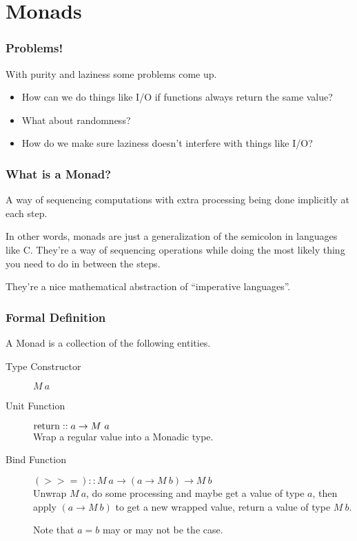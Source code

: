 \documentclass[presentation.tex]{subfiles}
\begin{document}
\section{Monads}
\begin{frame}
  \frametitle{Problems!}

  With purity and laziness some problems come up.

  \begin{itemize}
  \item How can we do things like I/O if functions always return the same value?
  \item What about randomness?
  \item How do we make sure laziness doesn't interfere with things like I/O?
  \end{itemize}
\end{frame}

\begin{frame}
  \frametitle{What is a Monad?}

  A way of sequencing computations with extra processing being done
  implicitly at each step.


\end{frame}

\begin{frame}
  In other words, monads are just a generalization of the semicolon in
  languages like C. They're a way of sequencing operations while doing
  the most likely thing you need to do in between the steps.

  They're a nice mathematical abstraction of ``imperative languages''.
\end{frame}

\begin{frame}
  \frametitle{Formal Definition}

  A Monad is a collection of the following entities.

  \begin{description}
  \item[Type Constructor]
    $M\ a$

  \item[Unit Function]
    $\operatorname{return}::a\rightarrow M\ a$\\
    Wrap a regular value into a Monadic type.

  \item[Bind Function]
    $(>>=)::M\ a\rightarrow(a\rightarrow M\ b)\rightarrow M\ b$\\
    Unwrap $M\ a$, do some processing and maybe get a value of type $a$, then
    apply $(a\rightarrow M\ b)$ to get a new wrapped value, return a value of
    type $M\ b$.

    Note that $a=b$ may or may not be the case.
  \end{description}
\end{frame}
\end{document}
